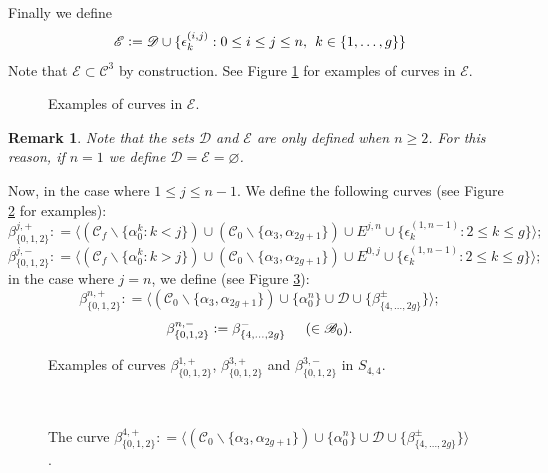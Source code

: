 \documentclass[twoside,11pt,a4paper]{article}
\newtheorem{Rem}[Def]{Remark}
\newcommand*{\Cf}{\mathscr{C}}
\newcommand*{\Cfn}{\Cf_{0}}
\newcommand*{\Cff}{\Cf_{f}}
\newcommand*{\Bf}{\mathscr{B}}
\newcommand*{\Df}{\mathscr{D}}
\newcommand*{\Ef}{\mathscr{E}}
\newcommand*{\epsp}[3]{\epsilon_{#1}^{(#2,#3)}}
\newcommand*{\ColonEqq}{\mathrel{\mathop:}=}
\begin{document}
\indent Finally we define $$\Ef \ColonEqq \Df \cup \{\epsp{k}{i}{j} : 0 \leq i \leq j \leq n, \hspace{0.15cm} k \in \{1, \ldots, g\}\}$$
\indent Note that $\Ef \subset \Cf^{3}$ by construction. See Figure \ref{MathfrakD} for examples of curves in $\Ef$.
\begin{figure}[h]
 \begin{center}
  \resizebox{10cm}{!}{} \caption{Examples of curves in $\Ef$.}\label{MathfrakD}
 \end{center}
\end{figure}
\begin{Rem}
 Note that the sets $\Df$ and $\Ef$ are only defined when $n \geq 2$. For this reason, if $n = 1$ we define $\Df = \Ef = \varnothing$.
\end{Rem}
\indent Now, in the case where $1 \leq j \leq n-1$. We define the following curves (see Figure \ref{ExamplesBetaT1} for examples): $$\beta_{\{0,1,2\}}^{j,+} \ColonEqq \langle (\Cff \backslash \{\alpha_{0}^{k} : k < j\}) \cup (\Cfn \backslash \{\alpha_{3}, \alpha_{2g+1}\}) \cup E^{j,n} \cup \{\epsp{k}{1}{n-1} : 2 \leq k \leq g\}\rangle;$$
$$\beta_{\{0,1,2\}}^{j,-} \ColonEqq \langle (\Cff \backslash \{\alpha_{0}^{k} : k > j\}) \cup (\Cfn \backslash \{\alpha_{3}, \alpha_{2g+1}\}) \cup E^{0,j} \cup \{\epsp{k}{1}{n-1} : 2 \leq k \leq g\}\rangle;$$
in the case where $j = n$, we define (see Figure \ref{DefBeta012nplusfig1}): $$\beta_{\{0,1,2\}}^{n,+} \ColonEqq \langle(\Cfn \backslash \{\alpha_{3}, \alpha_{2g+1}\}) \cup \{\alpha_{0}^{n}\} \cup \Df \cup \{\beta_{\{4, \ldots, 2g\}}^{\pm}\}\rangle;$$ $$\beta_{\{0,1,2\}}^{n,-} \ColonEqq \beta_{\{4, \ldots, 2g\}}^{-} \hspace{0.5cm}(\in \Bf_{0}).$$
\begin{figure}[h]
 \begin{center}
  \resizebox{10cm}{!}{} \caption{Examples of curves $\beta_{\{0,1,2\}}^{1,+}$, $\beta_{\{0,1,2\}}^{3,+}$ and $\beta_{\{0,1,2\}}^{3,-}$ in $S_{4,4}$.}\label{ExamplesBetaT1}
 \end{center}
\end{figure}
\begin{figure}[h]
 \begin{center}
  \resizebox{10cm}{!}{}\\[0.3cm]
  \resizebox{10cm}{!}{} \caption{The curve $\beta_{\{0,1,2\}}^{4,+} \ColonEqq \langle(\Cfn \backslash \{\alpha_{3}, \alpha_{2g+1}\}) \cup \{\alpha_{0}^{n}\} \cup \Df \cup \{\beta_{\{4, \ldots, 2g\}}^{\pm}\}\rangle$.} \label{DefBeta012nplusfig1}
 \end{center}
\end{figure}\\
\end{document}
